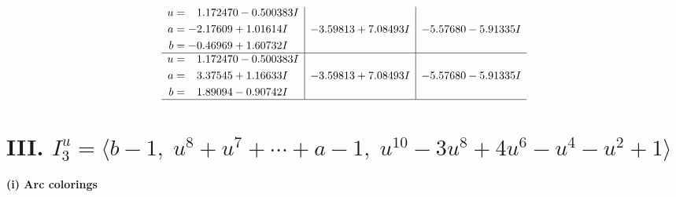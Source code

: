 \documentclass[1p]{elsarticle_modified}
\theoremstyle{definition}
\begin{document}
$$\begin{array}{c|c|c}
\begin{aligned}
u &= \phantom{-}1.172470 - 0.500383 I \\
a &= -2.17609 + 1.01614 I \\
b &= -0.46969 + 1.60732 I\end{aligned}
 & -3.59813 + 7.08493 I & -5.57680 - 5.91335 I \\ \hline\begin{aligned}
u &= \phantom{-}1.172470 - 0.500383 I \\
a &= \phantom{-}3.37545 + 1.16633 I \\
b &= \phantom{-}1.89094 - 0.90742 I\end{aligned}
 & -3.59813 + 7.08493 I & -5.57680 - 5.91335 I\\
 \hline 
 \end{array}$$\newpage\newpage\renewcommand{\arraystretch}{1}
\centering \section*{III. $I^u_{3}= \langle b-1,\;u^8+u^7+\cdots+a-1,\;u^{10}-3 u^8+4 u^6- u^4- u^2+1 \rangle$}
\flushleft \textbf{(i) Arc colorings}\\
\end{document}
